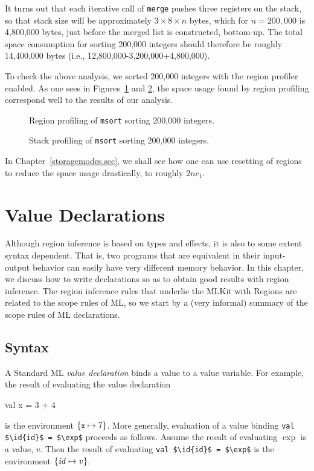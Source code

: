 \documentclass[12pt]{book}
\begin{document}
It turns out that each iterative call of \lstinline{merge} pushes three
registers on the stack, so that stack size will be approximately $3\times
8\times n$ bytes, which for $n=200,000$ is 4,800,000 bytes, just before the
merged list is constructed, bottom-up. The total space consumption for sorting
200,000 integers should therefore be roughly 14,400,000 bytes (i.e.,
12,800,000-3,200,000+4,800,000).

To check the above analysis, we sorted 200,000 integers with the region profiler
enabled.  As one sees in Figures~\ref{msortregion.fig} and \ref{msortstack.fig},
the space usage found by region profiling correspond well to the results of our
analysis.
\begin{figure}%
\caption{Region profiling of \lstinline{msort} sorting 200,000 integers.}
\label{msortregion.fig}
\end{figure}

\begin{figure}%
\caption{Stack profiling of \lstinline{msort} sorting 200,000 integers.}
\label{msortstack.fig}
\end{figure}

In Chapter~\ref{storagemodes.sec}, we shall see how one can use resetting of
regions to reduce the space usage drastically, to roughly $2nc_1$.
%
%

\chapter{Value Declarations}
\label{valdecl.sec}

Although region inference is based on types and effects, it is also to some
extent syntax dependent. That is, two programs that are equivalent in their
input-output behavior can easily have very different memory behavior. In this
chapter, we discuss how to write
%
%
declarations so as to obtain good results with region inference. The region
inference rules that underlie the MLKit with Regions are related to the scope
rules of ML, so we start by a (very informal) summary of the scope rules of ML
declarations.

\section{Syntax}
A Standard ML {\em value declaration} binds a value to a value
%
%
variable. For example, the result of evaluating the value declaration
\begin{smlcode}
  val x = 3 + 4
\end{smlcode}
is the
%
%
environment $\{\mbox{\small\ttfamily x}\mapsto 7\}$. More generally, evaluation of a
value binding \lstinline!val $\id{id}$ = $\exp$! proceeds as follows. Assume
the result of evaluating $\exp$ is a value, $v$.  Then the result of
evaluating \lstinline!val $\id{id}$ = $\exp$! is the environment $\{{\it id}\mapsto
v\}$.
\end{document}
